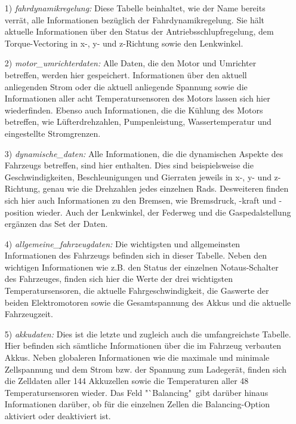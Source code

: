 \documentclass[fontsize = 12pt, paper = a4]{scrreprt}
\begin{document}
\begin{itemize}

\item[1)] \textit{fahrdynamikregelung:} 
Diese Tabelle beinhaltet, wie der Name bereits verrät, alle Informationen bezüglich der Fahrdynamikregelung. Sie hält aktuelle Informationen über den Status der Antriebsschlupfregelung, dem Torque-Vectoring in x-, y- und z-Richtung sowie den Lenkwinkel.

\item[2)] \textit{motor\_umrichterdaten:}
Alle Daten, die den Motor und Umrichter betreffen, werden hier gespeichert. Informationen über den aktuell anliegenden Strom oder die aktuell anliegende Spannung sowie die Informationen aller acht Temperatursensoren des Motors lassen sich hier wiederfinden. Ebenso auch Informationen, die die Kühlung des Motors betreffen, wie Lüfterdrehzahlen, Pumpenleistung, Wassertemperatur und eingestellte Stromgrenzen.

\item[3)] \textit{dynamische\_daten:}
Alle Informationen, die die dynamischen Aspekte des Fahrzeugs betreffen, sind hier enthalten. Dies sind beispielsweise die Geschwindigkeiten, Be\-schleunigungen und Gierraten jeweils in x-, y- und z-Richtung, genau wie die Drehzahlen jedes einzelnen Rads. Desweiteren finden sich hier auch Informationen zu den Bremsen, wie Bremsdruck, -kraft und -position wieder. Auch der Lenkwinkel, der Federweg und die Gaspedalstellung ergänzen das Set der Daten.

\item[4)] \textit{allgemeine\_fahrzeugdaten:} 
Die wichtigsten und allgemeinsten Informationen des Fahrzeugs befinden sich in dieser Tabelle. Neben den wichtigen Informationen wie z.B. den Status der einzelnen Notaus-Schalter des Fahrzeuges, finden sich hier die Werte der drei wichtigsten Temperatursensoren, die aktuelle Fahrgeschwindigkeit, die Gaswerte der beiden Elektromotoren sowie die Gesamtspannung des Akkus und die aktuelle Fahrzeugzeit.

\item[5)] \textit{akkudaten:} Dies ist die letzte und zugleich auch die umfangreichste Tabelle. \\Hier befinden sich sämtliche Informationen über die im Fahrzeug verbauten Akkus. Neben globaleren Informationen wie die maximale und minimale Zellspannung und dem Strom bzw. der Spannung zum Ladegerät, finden sich die Zelldaten aller 144 Akkuzellen sowie die Temperaturen aller 48 Temperatursensoren wieder. Das Feld "`Balancing"\ gibt darüber hinaus Informationen darüber, ob für die einzelnen Zellen die Balancing-Option aktiviert oder deaktiviert ist.

\end{itemize}
\end{document}

